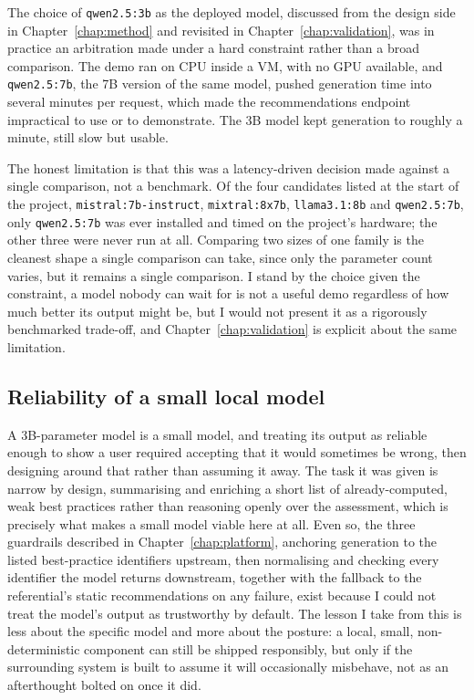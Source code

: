 The choice of \texttt{qwen2.5:3b} as the deployed model, discussed from the design side in Chapter~\ref{chap:method} and revisited in Chapter~\ref{chap:validation}, was in practice an arbitration made under a hard constraint rather than a broad comparison. The demo ran on CPU inside a VM, with no GPU available, and \texttt{qwen2.5:7b}, the 7B version of the same model, pushed generation time into several minutes per request, which made the recommendations endpoint impractical to use or to demonstrate. The 3B model kept generation to roughly a minute, still slow but usable.

The honest limitation is that this was a latency-driven decision made against a single comparison, not a benchmark. Of the four candidates listed at the start of the project, \texttt{mistral:7b-instruct}, \texttt{mixtral:8x7b}, \texttt{llama3.1:8b} and \texttt{qwen2.5:7b}, only \texttt{qwen2.5:7b} was ever installed and timed on the project's hardware; the other three were never run at all. Comparing two sizes of one family is the cleanest shape a single comparison can take, since only the parameter count varies, but it remains a single comparison. I stand by the choice given the constraint, a model nobody can wait for is not a useful demo regardless of how much better its output might be, but I would not present it as a rigorously benchmarked trade-off, and Chapter~\ref{chap:validation} is explicit about the same limitation.

\subsection{Reliability of a small local model}
\label{sec:pm-model-reliability}

A 3B-parameter model is a small model, and treating its output as reliable enough to show a user required accepting that it would sometimes be wrong, then designing around that rather than assuming it away. The task it was given is narrow by design, summarising and enriching a short list of already-computed, weak best practices rather than reasoning openly over the assessment, which is precisely what makes a small model viable here at all. Even so, the three guardrails described in Chapter~\ref{chap:platform}, anchoring generation to the listed best-practice identifiers upstream, then normalising and checking every identifier the model returns downstream, together with the fallback to the referential's static recommendations on any failure, exist because I could not treat the model's output as trustworthy by default. The lesson I take from this is less about the specific model and more about the posture: a local, small, non-deterministic component can still be shipped responsibly, but only if the surrounding system is built to assume it will occasionally misbehave, not as an afterthought bolted on once it did.

